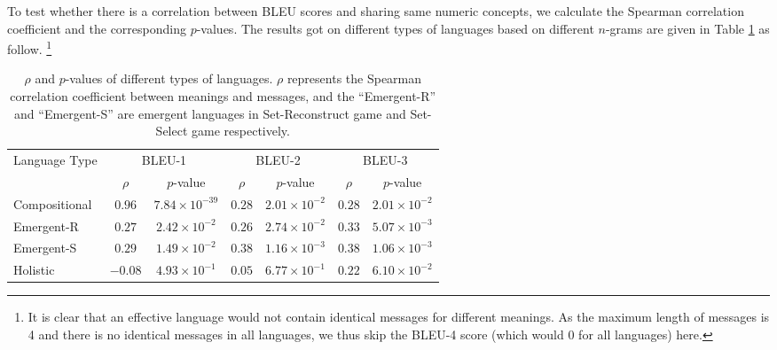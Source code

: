 To test whether there is a correlation between BLEU scores and sharing same numeric concepts, we calculate the Spearman correlation coefficient and the corresponding $p$-values. The results got on different types of languages based on different $n$-grams are given in Table \ref{tab4.5:p-values} as follow. \footnote{It is clear that an effective language would not contain identical messages for different meanings. As the maximum length of messages is 4 and there is no identical messages in all languages, we thus skip the BLEU-4 score (which would 0 for all languages) here. }

\begin{table}[!h]
    \centering
    \begin{tabular}{|l|c|c|c|c|c|c|}
    \hline
    \multicolumn{1}{|c|}{\multirow{2}{*}{Language Type}} & \multicolumn{2}{c|}{BLEU-1}      & \multicolumn{2}{c|}{BLEU-2}                                      & \multicolumn{2}{c|}{BLEU-3}    \\ \cline{2-7} 
    \multicolumn{1}{|c|}{}                               & $\rho$  & $p$-value              & $\rho$ & $p$-value                                               & $\rho$ & $p$-value             \\ \hline
    Compositional                                        & $0.96$  & $7.84 \times 10^{-39}$ & $0.28$ & $2.01\times 10^{-2}$                                   & $0.28$ & $2.01\times 10^{-2}$ \\ \hline
    Emergent-R                                           & $0.27$  & $2.42\times 10^{-2}$  & $0.26$ & $2.74\times 10^{-2}$                                   & $0.33$ & $5.07\times 10^{-3}$ \\ \hline
    Emergent-S                                           & $0.29$  & $1.49\times 10^{-2}$  & $0.38$ & $1.16\times 10^{-3}$                                   & $0.38$ & $1.06\times 10^{-3}$ \\ \hline
    Holistic                                             & $-0.08$ & $4.93\times 10^{-1}$  & $0.05$ & $6.77 \times 10^{-1}$ & $0.22$ & $6.10\times 10^{-2}$ \\ \hline
    \end{tabular}
    \caption{$\rho$ and $p$-values of different types of languages. $\rho$ represents the Spearman correlation coefficient between meanings and messages, and the ``Emergent-R'' and ``Emergent-S'' are emergent languages in Set-Reconstruct game and Set-Select game respectively. }
    \label{tab4.5:p-values}
\end{table}

